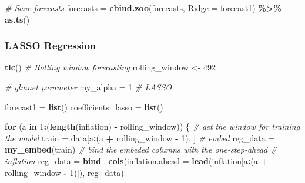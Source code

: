 \documentclass[
]{article}
\newenvironment{Shaded}{\begin{snugshade}}{\end{snugshade}}
\newcommand{\AttributeTok}[1]{\textcolor[rgb]{0.13,0.29,0.53}{#1}}
\newcommand{\CommentTok}[1]{\textcolor[rgb]{0.56,0.35,0.01}{\textit{#1}}}
\newcommand{\ControlFlowTok}[1]{\textcolor[rgb]{0.13,0.29,0.53}{\textbf{#1}}}
\newcommand{\DecValTok}[1]{\textcolor[rgb]{0.00,0.00,0.81}{#1}}
\newcommand{\FunctionTok}[1]{\textcolor[rgb]{0.13,0.29,0.53}{\textbf{#1}}}
\newcommand{\NormalTok}[1]{#1}
\newcommand{\OtherTok}[1]{\textcolor[rgb]{0.56,0.35,0.01}{#1}}
\newcommand{\SpecialCharTok}[1]{\textcolor[rgb]{0.81,0.36,0.00}{\textbf{#1}}}
\begin{document}
\begin{Shaded}
\begin{Highlighting}[]
\CommentTok{\# Save forecasts}
\NormalTok{forecasts }\OtherTok{=} \FunctionTok{cbind.zoo}\NormalTok{(forecasts, }\AttributeTok{Ridge =}\NormalTok{ forecast1) }\SpecialCharTok{\%\textgreater{}\%}
    \FunctionTok{as.ts}\NormalTok{()}
\end{Highlighting}
\end{Shaded}

\hypertarget{lasso-regression}{%
\subsubsection{LASSO Regression}\label{lasso-regression}}

\begin{Shaded}
\begin{Highlighting}[]
\FunctionTok{tic}\NormalTok{()}
\CommentTok{\# Rolling window forecasting}
\NormalTok{rolling\_window }\OtherTok{\textless{}{-}} \DecValTok{492}

\CommentTok{\# glmnet parameter}
\NormalTok{my\_alpha }\OtherTok{=} \DecValTok{1}  \CommentTok{\# LASSO}

\NormalTok{forecast1 }\OtherTok{=} \FunctionTok{list}\NormalTok{()}
\NormalTok{coefficients\_lasso }\OtherTok{=} \FunctionTok{list}\NormalTok{()}


\ControlFlowTok{for}\NormalTok{ (a }\ControlFlowTok{in} \DecValTok{1}\SpecialCharTok{:}\NormalTok{(}\FunctionTok{length}\NormalTok{(inflation) }\SpecialCharTok{{-}}\NormalTok{ rolling\_window)) \{}
    \CommentTok{\# get the window for training the model}
\NormalTok{    train }\OtherTok{=}\NormalTok{ data[a}\SpecialCharTok{:}\NormalTok{(a }\SpecialCharTok{+}\NormalTok{ rolling\_window }\SpecialCharTok{{-}} \DecValTok{1}\NormalTok{), ]}
    \CommentTok{\# embed}
\NormalTok{    reg\_data }\OtherTok{=} \FunctionTok{my\_embed}\NormalTok{(train)}
    \CommentTok{\# bind the embeded columns with the one{-}step{-}ahead}
    \CommentTok{\# inflation}
\NormalTok{    reg\_data }\OtherTok{=} \FunctionTok{bind\_cols}\NormalTok{(}\AttributeTok{inflation.ahead =} \FunctionTok{lead}\NormalTok{(inflation[a}\SpecialCharTok{:}\NormalTok{(a }\SpecialCharTok{+}
\NormalTok{        rolling\_window }\SpecialCharTok{{-}} \DecValTok{1}\NormalTok{)]), reg\_data)}


\end{Highlighting}
\end{Shaded}
\end{document}
